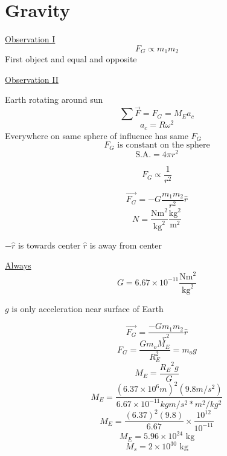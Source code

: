 \documentclass[fleqn]{article}
\begin{document}
\setlength{\mathindent}{0pt}
\section*{Gravity}
\underline{Observation I}
\[ F_G \propto m_1 m_2\]
First object and equal and opposite

\bigbreak
\underline{Observation II}

Earth rotating around sun
\[ \sum \vec{F} = F_G = M_Ea_c \]
\[ a_c = R \omega ^2 \]
Everywhere on same sphere of influence has same $F_G$
\[ F_G \text{ is constant on the sphere}  \]
\[ \text{S.A.} = 4 \pi r^2 \]

\[ F_G \propto \frac{1}{r^2}  \]

\[ \vec{F_G}=-G
\frac{m_1m_2}{r^2} \hat{r} \]
\[ N=\frac{\text{Nm}^2}{\text{kg}^2}\frac{\text{kg}^2}{\text{m}^2}   \]

$- \hat{r}$ is towards center $\hat{r}$ is away from center

\underline{Always}
\[ G = 6.67 \times 10^{-11} \frac{\text{Nm}^2}{\text{kg}^2}  \]

$g$ is only acceleration near surface of Earth

\[ \vec{F_G} = \frac{-Gm_1m_2}{r^2} \hat{r} \]
\[ F_G=\frac{Gm_oM_E}{R_E ^2} = m_og \]
\[ M_E = \frac{{R_E}^2 g}{G} \]
\[ M_E = \frac{(6.37 \times 10^6 m)^2(9.8 m/s^2)}{6.67 \times 10^{-11} kgm/s^2*m^2/kg^2} \]
\[ M_E = \frac{(6.37)^2 (9.8)}{6.67} \times \frac{10^{12}}{10^{-11}}   \]
\[ M_E = 5.96 \times 10^{24} \text{ kg}  \]
\[ M_s = 2 \times 10^{30} \text{ kg}  \]
\end{document}
